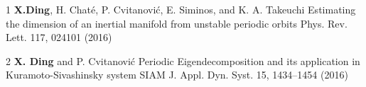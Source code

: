 
\begin{cvpub}

  \cvpubentry
  {1}
  {\textbf{X.Ding},  H. Chat\'e, P. Cvitanovi\'c, E. Siminos, and K. A. Takeuchi}
  {Estimating the dimension of an inertial manifold from unstable periodic orbits}
  {Phys. Rev. Lett. 117, 024101 (2016)}

  \cvpubentry
  {2}
  {\textbf{X. Ding} and P. Cvitanovi\'c}
  {Periodic Eigendecomposition and its application in Kuramoto-Sivashinsky system}
  {SIAM J. Appl. Dyn. Syst. 15, 1434–1454 (2016)}


\end{cvpub}
